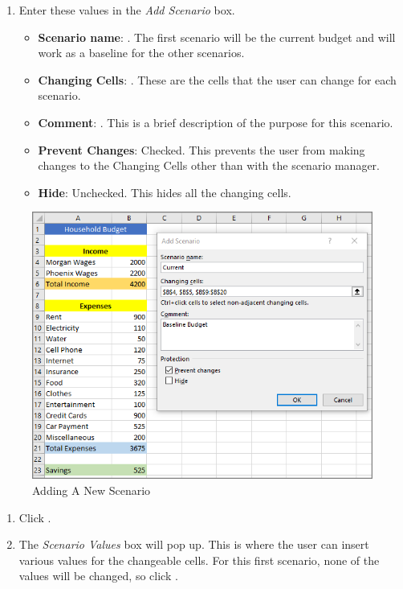 \begin{enumerate}[resume]	
	
	\item Enter these values in the \textit{Add Scenario} box.
	
	\begin{itemize}
		\item \textbf{Scenario name}: . The first scenario will be the current budget and will work as a baseline for the other scenarios.
		\item \textbf{Changing Cells}: . These are the cells that the user can change for each scenario.
		\item \textbf{Comment}: . This is a brief description of the purpose for this scenario.
		\item \textbf{Prevent Changes}: Checked. This prevents the user from making changes to the Changing Cells other than with the scenario manager.
		\item \textbf{Hide}: Unchecked. This hides all the changing cells.
	\end{itemize}

\end{enumerate}

\begin{figure}[H]
	\centering
	\includegraphics[width=\maxwidth{.95\linewidth}]{gfx/ch08_fig51}
	\caption{Adding A New Scenario}
	\label{08:fig51}
\end{figure}

\begin{enumerate}[resume]

	\item Click .
	\item The \textit{Scenario Values} box will pop up. This is where the user can insert various values for the changeable cells. For this first scenario, none of the values will be changed, so click .
	
\end{enumerate}

